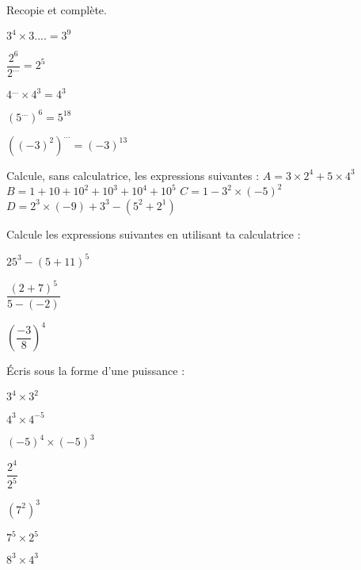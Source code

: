 \begin{exercice}[]
Recopie et complète.

\begin{colenumerate}{2} 
\item $3^4 \times 3.... = 3^9$
\item $\dfrac{2^6}{2^{...}}=2^5$
\item $4^{...} \times 4^3 = 4^3$
\item $\left(5^{...}\right)^6 = 5^{18}$
\item $\left(\left(-3\right)^2\right)^{...}=\left(-3\right)^{13}$
\end{colenumerate} 
\end{exercice}






\begin{exercice}[]
Calcule, sans calculatrice, les expressions suivantes :
$A = 3 \times 2^4 + 5 \times 4^3$
$B = 1 + 10 + 10^2 + 10^3 + 10^4 + 10^5$
$C = 1 -3^2 \times (-5)^2$
$D = 2^3 \times (-9) + 3^3 -(5^2 + 2^1)$
\end{exercice}

\begin{exercice}[]

Calcule les expressions suivantes en utilisant ta calculatrice :

\begin{colenumerate}{2} 
\item $25^3-\left(5 + 11\right)^5$
\item $\dfrac{\left(2+7\right)^5}{5-(-2)}$
\item $\left(\dfrac{-3}{8}\right)^4$
\end{colenumerate}
\end{exercice}

\begin{exercice}[]
Écris sous la forme d'une puissance :

\begin{colenumerate}{3} 
\item $3^4 \times 3^2$
\item $4^3 \times 4^{-5}$
\item $(-5)^4 \times (-5)^3$
\item $\dfrac{2^4}{2^5}$
\item $\left(7^2\right)^3$
\item $7^5 \times 2^5$
\item $8^3 \times 4^3$
\end{colenumerate} 
\end{exercice}



